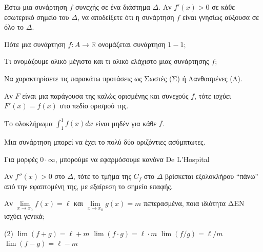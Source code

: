 \documentclass[11pt,a4paper]{article}
\newcommand{\kerkissans}[1]{{\fontfamily{maksf}\selectfont \textbf{#1}}}
\renewcommand{\textdexiakeraia}{}
\newcommand{\dint}{\displaystyle\int}
\newcommand\themanum{A}
\newcounter{thema}[section]
\renewcommand{\thethema}{\arabic{thema}}
\newcommand{\Thema}{\refstepcounter{thema}{\textbf{\textcolor{black}{\faPenSquare\ \  \large \kerkissans{\textbf{\thethemaο\hspace{2mm}Διαγώνισμα - Θέμα \themanum}}}}}\hspace{0mm}}{}
\newenvironment{thema}[1]
{\begin{tcolorbox}[title=\Thema\kerkissans{\textbf{\large{  #1}}},breakable,
enhanced standard,titlerule=0pt,toprule=0pt, rightrule=0pt, bottomrule=0pt,
colback=white,left=0mm,top=1mm,bottom=0mm,
boxrule=0pt,
colframe=white,leftrule=0mm,sharp corners,coltitle=black]
\renewcommand{\themanum}{#1}}
{\end{tcolorbox}}
\newcommand{\eng}[1]{\selectlanguage{english}#1\selectlanguage{greek}}
\begin{document}
\begin{thema}{A}
\begin{erwthma}
    \item Έστω μια συνάρτηση $f$ συνεχής σε ένα διάστημα $\Delta$. Αν $f'(x)>0$ σε κάθε εσωτερικό σημείο του $\Delta$, να αποδείξετε ότι η συνάρτηση $f$ είναι γνησίως αύξουσα σε όλο το $\Delta$.
    \item Πότε μια συνάρτηση $f:A\to\mathbb{R}$ ονομάζεται συνάρτηση $1-1$;
    \item Τι ονομάζουμε ολικό μέγιστο και τι ολικό ελάχιστο μιας συνάρτησης $f$;
    \item Να χαρακτηρίσετε τις παρακάτω προτάσεις ως Σωστές (Σ) ή Λανθασμένες (Λ).
    \begin{alist}
        \item Αν $F$ είναι μια παράγουσα της καλώς ορισμένης και συνεχούς $f$, τότε ισχύει $F'(x) = f(x)$ στο πεδίο ορισμού της.
        \item Το ολοκλήρωμα $\dint_1^1 f(x)dx$ είναι μηδέν για κάθε $f$.
        \item Μια συνάρτηση μπορεί να έχει το πολύ δύο οριζόντιες ασύμπτωτες.
        \item Για μορφές $0 \cdot \infty$, μπορούμε να εφαρμόσουμε κανόνα \eng{De L'Hospital}
        \item Αν $f''(x)>0$ στο $\Delta$, τότε το τμήμα της $C_f$ στο $\Delta$ βρίσκεται εξολοκλήρου ``πάνω'' από την εφαπτομένη της, με εξαίρεση το σημείο επαφής.
    \end{alist}
    \item Αν $\lim\limits_{x\to x_0} f(x) = \ell$ και $\lim\limits_{x\to x_0} g(x) = m$ πεπερασμένα, ποια ιδιότητα ΔΕΝ ισχύει γενικά;
    \begin{tasks}[label=\let\textdexiakeraia\relax\alph*.](2)
        \task $\lim (f+g) = \ell + m$
        \task $\lim (f \cdot g) = \ell \cdot m$
        \task $\lim (f/g) = \ell/m$
        \task $\lim (f - g) = \ell - m$
    \end{tasks}
\end{erwthma}
\end{thema}
\vspace{1cm}
\end{document}
